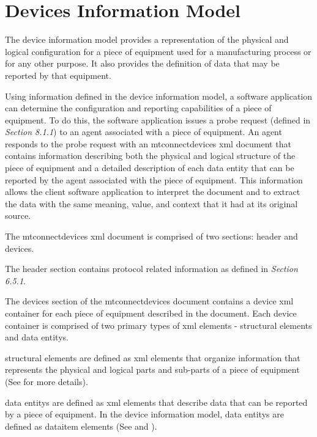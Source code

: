 
\section{Devices Information Model}
\label{sec:Devices Information Model}
The \gls{device information model} provides a representation of the physical and logical configuration for a piece of equipment used for a manufacturing process or for any other purpose.  It also provides the definition of data that may be reported by that equipment. 

Using information defined in the \gls{device information model}, a software application can determine the configuration and reporting capabilities of a piece of equipment.  To do this, the software application issues a \gls{probe request} (defined in  \textit{Section 8.1.1}) to an \gls{agent} associated with a piece of equipment. An \gls{agent} responds to the \gls{probe request} with an \gls{mtconnectdevices} \gls{xml} document that contains information describing both the physical and logical structure of the piece of equipment and a detailed description of each \gls{data entity} that can be reported by the \gls{agent} associated with the piece of equipment.   This information allows the client software application to interpret the document and to extract the data with the same meaning, value, and context that it had at its original source.  

The \gls{mtconnectdevices} \gls{xml} document is comprised of two sections: \gls{header} and \gls{devices}.

The \gls{header} section contains protocol related information as defined in  \textit{Section 6.5.1}.

The \gls{devices} section of the \gls{mtconnectdevices} document contains a \gls{device} \gls{xml} container for each piece of equipment described in the document.   Each \gls{device} container is comprised of two primary types of \gls{xml} elements - \glspl{structural element} and \glspl{data entity}.  

\glspl{structural element} are defined as \gls{xml} elements that organize information that represents the physical and logical parts and sub-parts of a piece of equipment (See  for more details).  

\glspl{data entity} are defined as \gls{xml} elements that describe data that can be reported by a piece of equipment.  In the \gls{device information model}, \glspl{data entity} are defined as \gls{dataitem} elements (See  and ).


